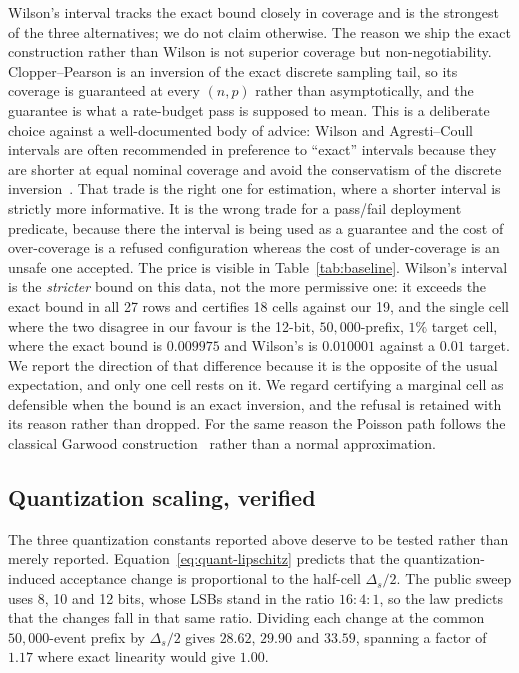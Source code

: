 \documentclass[preprint,12pt]{elsarticle}
\begin{document}
Wilson's interval tracks the exact bound closely in coverage and is the
strongest of the three alternatives; we do not claim otherwise.  The reason we
ship the exact construction rather than Wilson is not superior coverage but
non-negotiability.  Clopper--Pearson is an inversion of the exact discrete
sampling tail, so its coverage is guaranteed at every $(n,p)$ rather than
asymptotically, and the guarantee is what a rate-budget pass is supposed to
mean.  This is a deliberate choice against a well-documented body of advice:
Wilson and Agresti--Coull intervals are often recommended in preference to
``exact'' intervals because they are shorter at equal nominal coverage and
avoid the conservatism of the discrete inversion~\cite{Agresti1998,Brown2001}.
That trade is the right one for estimation, where a shorter interval is
strictly more informative.  It is the wrong trade for a pass/fail deployment
predicate, because there the interval is being used as a guarantee and the
cost of over-coverage is a refused configuration whereas the cost of
under-coverage is an unsafe one accepted.  The price is visible in
Table~\ref{tab:baseline}.  Wilson's interval is the \emph{stricter} bound on this
data, not the more permissive one: it exceeds the exact bound in all 27 rows and
certifies 18 cells against our 19, and the single cell where the two disagree in
our favour is the 12-bit, $50{,}000$-prefix, $1\%$ target cell, where the exact
bound is $0.009975$ and Wilson's is $0.010001$ against a $0.01$ target.  We
report the direction of that difference because it is the opposite of the usual
expectation, and only one cell rests on it.  We regard certifying a marginal cell
as defensible when the bound is an exact inversion, and the refusal is retained
with its reason rather than dropped.  For the same reason the Poisson path
follows the classical Garwood construction~\cite{Garwood1936} rather than a
normal approximation.

\subsection{Quantization scaling, verified}
\label{sec:quant-results}

The three quantization constants reported above deserve to be tested rather than
merely reported.  Equation~\eqref{eq:quant-lipschitz} predicts that the
quantization-induced acceptance change is proportional to the half-cell
$\Delta_s/2$.  The public sweep uses 8, 10 and 12 bits, whose LSBs stand in the
ratio $16:4:1$, so the law predicts that the changes fall in that same ratio.
Dividing each change at the common $50{,}000$-event prefix by $\Delta_s/2$ gives
$28.62$, $29.90$ and $33.59$, spanning a factor of $1.17$ where exact linearity
would give $1.00$.
\end{document}
